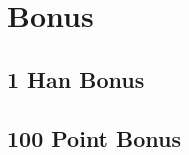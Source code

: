 \section{Bonus}\label{core:sec:bonus}

\subsection{1 Han Bonus}\label{core:ssec:1-han-bonus}

\subsection{100 Point Bonus}\label{core:ssec:100-point-bonus}
